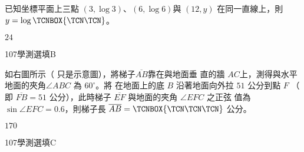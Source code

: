 \begin{QUESTIONS}
\begin{QUESTION}
\begin{QBODY}
            已知坐標平面上三點 $(3, \log 3)$、$(6,\log 6)$與 $(12, y)$ 在同一直線上，則 $y = \log \TCNBOX{\TCN\TCN}$。
        \end{QBODY}
        \begin{QFROMS}
        \end{QFROMS}
        \begin{QTAGS}\end{QTAGS}
        \begin{QANS}
            $24$
        \end{QANS}
        \begin{QSOLLIST}
        \end{QSOLLIST}
        \begin{QEMPTYSPACE}
        \end{QEMPTYSPACE}
    \end{QUESTION}
    \begin{QUESTION}
        \begin{ExamInfo}{107}{學測}{選填}{B}
        \end{ExamInfo}
        \begin{ExamAnsRateInfo}{}{}{}{}
        \end{ExamAnsRateInfo}
        \begin{QBODY}
            如右圖所示（ 只是示意圖），將梯子$\overline{AB}$靠在與地面垂
            直的牆 $AC$上，測得與水平地面的夾角$\angle ABC$ 為 $60^\circ$。將
            在地面上的底 $B$ 沿著地面向外拉 $51$ 公分到點 $F$ （ 即
            $\overline{FB} = 51$ 公分），此時梯子 $\overline{EF}$ 與地面的夾角 $\angle EFC$ 之正弦
            值為 $\sin \angle EFC = 0.6$，則梯子長 $\overline{AB}=\TCNBOX{\TCN\TCN\TCN}$ 公分。
        \end{QBODY}
        \begin{QFROMS}
        \end{QFROMS}
        \begin{QTAGS}\end{QTAGS}
        \begin{QANS}
            $170$
        \end{QANS}
        \begin{QSOLLIST}
        \end{QSOLLIST}
        \begin{QEMPTYSPACE}
        \end{QEMPTYSPACE}
    \end{QUESTION}
    \begin{QUESTION}
        \begin{ExamInfo}{107}{學測}{選填}{C}

\end{ExamInfo}
\end{QUESTION}
\end{QUESTIONS}
